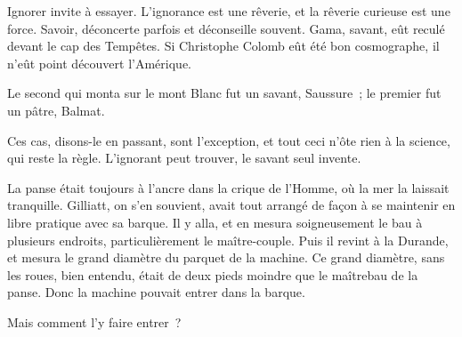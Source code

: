 \documentclass[french,twoside]{book} %
\begin{document}
Ignorer invite à essayer. L’ignorance est une rêverie, et la rêverie curieuse est une force. Savoir,  déconcerte parfois et déconseille souvent. Gama, savant, eût reculé devant le cap des Tempêtes. Si Christophe Colomb eût été bon cosmographe, il n’eût point découvert l’Amérique.\par
Le second qui monta sur le mont Blanc fut un savant, Saussure ; le premier fut un pâtre, Balmat.\par
Ces cas, disons-le en passant, sont l’exception, et tout ceci n’ôte rien à la science, qui reste la règle. L’ignorant peut trouver, le savant seul invente.\par
La panse était toujours à l’ancre dans la crique de l’Homme, où la mer la laissait tranquille. Gilliatt, on s’en souvient, avait tout arrangé de façon à se maintenir en libre pratique avec sa barque. Il y alla, et en mesura soigneusement le bau à plusieurs endroits, particulièrement le maître-couple. Puis il revint à la Durande, et mesura le grand diamètre du parquet de la machine. Ce grand diamètre, sans les roues, bien entendu, était de deux pieds moindre que le maîtrebau de la panse. Donc la machine pouvait entrer dans la barque.\par
Mais comment l’y faire entrer ?
\end{document}
